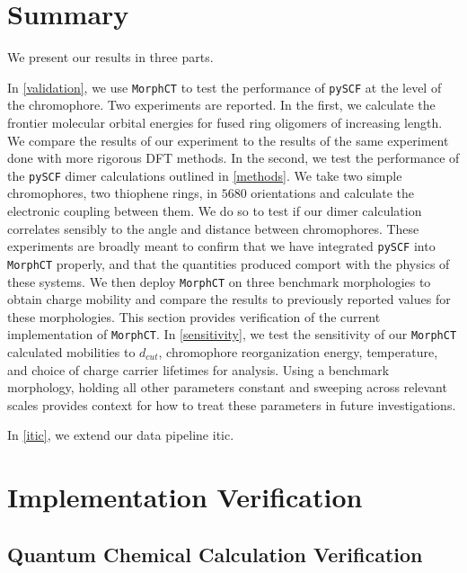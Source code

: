 \label{results}

\section{Summary}

We present our results in three parts. 

In \autoref{validation}, we use \texttt{MorphCT} to test the performance of \texttt{pySCF} at the level of the chromophore.
Two experiments are reported. In the first, we calculate the frontier molecular orbital
energies for fused ring oligomers of increasing length. We compare the results of our experiment to the
results of the same experiment done with more rigorous DFT methods. In the second, we test the 
performance of the \texttt{pySCF} dimer calculations outlined in \autoref{methods}. 
We take two simple chromophores, two thiophene rings, in $5680$ orientations and calculate the
electronic coupling between them. We do so to test if our dimer calculation correlates sensibly to the angle
and distance between chromophores. These experiments are broadly meant to confirm that we have integrated
\texttt{pySCF} into \texttt{MorphCT} properly, and that the quantities produced comport with the physics of these systems.
We then deploy \texttt{MorphCT} on three benchmark  morphologies to obtain charge mobility
and compare the results to previously reported values for these morphologies. This section provides verification of the current implementation of \texttt{MorphCT}.
In \autoref{sensitivity}, we test the sensitivity of our \texttt{MorphCT}
calculated mobilities to $d_{cut}$, chromophore
reorganization energy,  temperature, and choice of charge carrier lifetimes for  analysis. Using a
benchmark  morphology, holding all other parameters constant and sweeping across relevant scales
provides context for how to treat these parameters in future investigations. 

In \autoref{itic}, we extend our data pipeline \gls{itic}. 

\section{Implementation Verification}

\label{validation}

\subsection{Quantum Chemical Calculation Verification}

